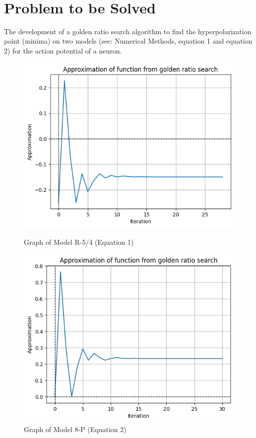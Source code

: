 \documentclass[linenumbers,RNAAS,trackchanges]{aastex631}
\begin{document}
\
\section{Problem to be Solved} \label{sec:problem}
The development of a golden ratio search algorithm to find the hyperpolarization point (minima) on two models (see: Numerical Methods, equation 1 and equation 2) for the action potential of a neuron. 

\begin{figure}[H]
    \centering
    \includegraphics[scale=.75]{ModelR54.png}
    \caption{Graph of Model R-5/4  (Equation 1)}
    \label{fig:asa}
    \centering
    \includegraphics[scale=.75]{Model8P.png}
    \caption{Graph of Model 8-P  (Equation 2)}
    \label{fig:code}
\end{figure}
\end{document}
